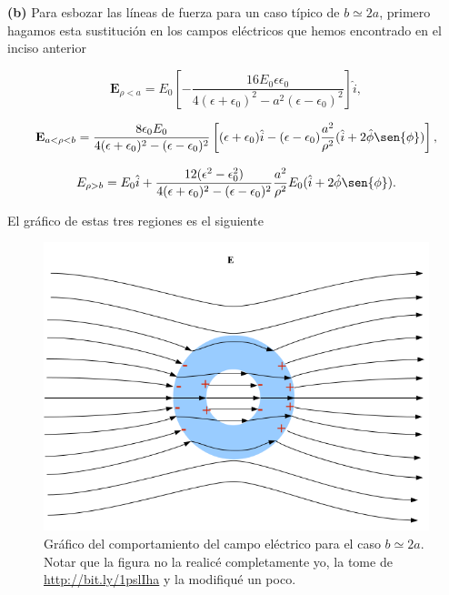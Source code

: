 \documentclass[a4paper,11pt]{article}
\numberwithin{equation}{section}
\begin{document}
\textbf{(b)} Para esbozar las líneas de fuerza para un caso típico de $b \simeq 2a$, 
primero hagamos esta sustitución en los campos eléctricos que hemos encontrado en 
el inciso anterior 

\begin{equation}
 \mathbf{E}_{\rho < a} = E_0 \left[- \frac{16 E_0 \epsilon
 \epsilon_0}{4(\epsilon + \epsilon_0)^2 
 - a^2(\epsilon - \epsilon_0)^2} \right]\hat{i},
\end{equation}

\begin{equation}
 \mathbf{E}_{a < \rho < b} = \frac{8\epsilon_0E_0}{4(\epsilon + \epsilon_0)^2 
 - (\epsilon - \epsilon_0)^2}\left[(\epsilon + \epsilon_0)\hat{i}
 - (\epsilon - \epsilon_0)\frac{a^2}{\rho^2}(\hat{i} + 2\hat{\phi}\sen{\phi})\right],
\end{equation}

\begin{equation}
 E_{\rho > b} = E_0 \hat{i} + \frac{12(\epsilon^2 - \epsilon_0^2)}{
 4(\epsilon + \epsilon_0)^2 - (\epsilon - \epsilon_0)^2}\frac{a^2}{\rho^2}
 E_0(\hat{i} + 2\hat{\phi}\sen{\phi}).
\end{equation}

El gráfico de estas tres regiones es el siguiente

\begin{figure}[H]
 \center 
 \includegraphics[scale=0.46]{problema3fig1}
 \caption{Gráfico del comportamiento del campo eléctrico para el caso $b\simeq 2a$. Notar 
 que la figura no la realicé completamente yo, la tome de 
 \href{http://bit.ly/1pslIha}{http://bit.ly/1pslIha} y 
 la modifiqué un poco.}
\end{figure}
\end{document}
